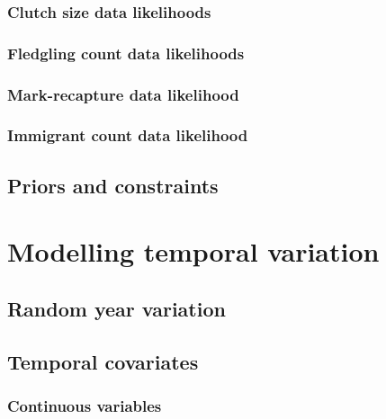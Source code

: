\documentclass[
]{book}
\begin{document}
\hypertarget{clutch-size-data-likelihoods}{%
\subsection{Clutch size data likelihoods}\label{clutch-size-data-likelihoods}}

\hypertarget{fledgling-count-data-likelihoods}{%
\subsection{Fledgling count data likelihoods}\label{fledgling-count-data-likelihoods}}

\hypertarget{mark-recapture-data-likelihood}{%
\subsection{Mark-recapture data likelihood}\label{mark-recapture-data-likelihood}}

\hypertarget{immigrant-count-data-likelihood}{%
\subsection{Immigrant count data likelihood}\label{immigrant-count-data-likelihood}}

\hypertarget{priors-and-constraints}{%
\section{Priors and constraints}\label{priors-and-constraints}}

\hypertarget{TempVar}{%
\chapter{Modelling temporal variation}\label{TempVar}}

\hypertarget{random-year-variation}{%
\section{Random year variation}\label{random-year-variation}}

\hypertarget{temporal-covariates}{%
\section{Temporal covariates}\label{temporal-covariates}}

\hypertarget{continuous-variables}{%
\subsection{Continuous variables}\label{continuous-variables}}
\end{document}
